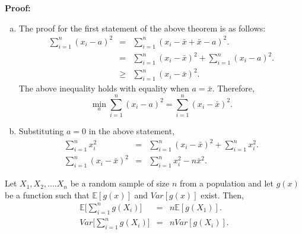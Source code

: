 \documentclass[a4paper,english,12pt]{article}
\begin{document}
\textbf{Proof:}
\begin{enumerate}[a)]
\item{ 
The proof for the first statement of the above theorem is as follows:
\begin{eqnarray}
\sum_{i=1}^{n} (x_i - a)^2 &=& \sum_{i=1}^{n} (x_i - \bar{x} + \bar{x} - a)^2. \nonumber \\
&=& \sum_{i=1}^{n} (x_i - \bar{x})^2 + \sum_{i=1}^{n} (x_i - a)^2.  \\
&\geq& \sum_{i=1}^{n} (x_i - \bar{x})^2.
\end{eqnarray}
The above inequality holds with equality when $a = \bar{x}$. Therefore,
\begin{equation}
 \min_{a} \sum_{i=1}^{n} (x_i - a)^2 = \sum_{i=1}^{n} (x_i - \bar{x})^2.
\end{equation}
}
\item{
Substituting $a = 0$ in the above statement,
\begin{eqnarray}
\sum_{i=1}^{n} x_i^2 &=& \sum_{i=1}^{n} (x_i - \bar{x})^2 + \sum_{i=1}^{n} x_i^2.  \nonumber \\
\sum_{i=1}^{n} (x_i - \bar{x})^2 &=& \sum_{i=1}^{n} x_i^2 - n \bar{x}^2.
\end{eqnarray}
}
\end{enumerate}
\begin{lem}
Let $X_1, X_2, .... X_n$ be a random sample of size $n$ from a population and let $g(x)$ be a function such that $\mathbb{E}[g(x)]$ and $Var[g(x)]$ exist. Then,
\begin{eqnarray}
\mathbb{E}\Big[ \sum_{i=1}^{n} g(X_i) \Big] &=& n \mathbb{E}[g(X_1)].\\
Var \Big[ \sum_{i=1}^{n} g(X_i) \Big] &=& n Var[g(X_i)].
\end{eqnarray}
\end{lem}
\end{document}
